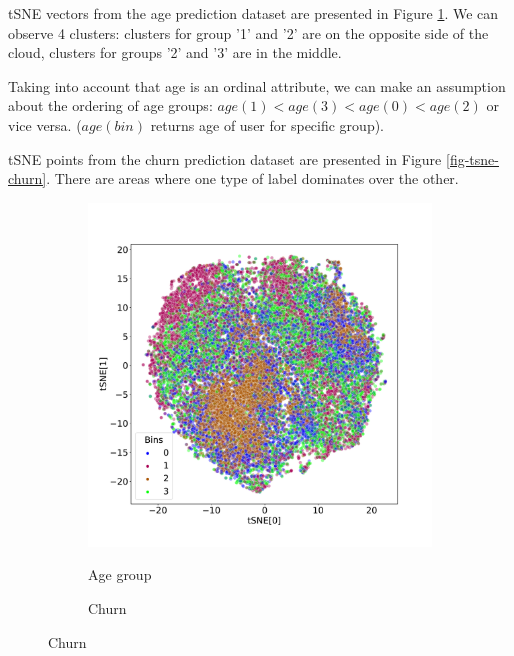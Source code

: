 \documentclass[sigconf]{acmart}
\begin{document}
tSNE vectors from the age prediction dataset are presented in Figure \ref{fig-tsne-age2}. We can observe 4 clusters: clusters for group '1' and '2' are on the opposite side of the cloud, clusters for groups '2' and '3' are in the middle.

Taking into account that age is an ordinal attribute, we can make an assumption about the ordering of age groups: $age(1) < age(3) < age(0) < age(2)$ or vice versa. ($age(bin)$ returns age of user for specific group).

tSNE points from the churn prediction dataset are presented in Figure \ref{fig-tsne-churn}. There are areas where one type of label dominates over the other.

\begin{figure}
  \centering
  \caption{2D tSNE mapping of CoLES embeddings colored by target labels}
  \begin{subfigure}{0.5\textwidth}
    \caption{Age group}
    \includegraphics[width=\textwidth]{figures/iclr-age-pred-tsne.pdf}
    \label{fig-tsne-age2}
  \end{subfigure}%
  \begin{subfigure}{0.5\textwidth}
    \caption{Churn}

\end{subfigure}
\end{figure}
\end{document}
